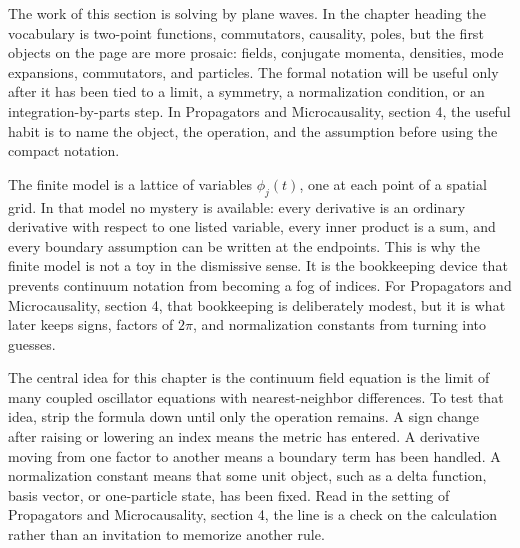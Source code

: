











The work of this section is solving by plane waves.  In the chapter heading the vocabulary is two-point functions, commutators, causality, poles, but the first objects on the page are more prosaic: fields, conjugate momenta, densities, mode expansions, commutators, and particles.  The formal notation will be useful only after it has been tied to a limit, a symmetry, a normalization condition, or an integration-by-parts step.  In Propagators and Microcausality, section 4, the useful habit is to name the object, the operation, and the assumption before using the compact notation.

The finite model is a lattice of variables \(\phi_j(t)\), one at each point of a spatial grid.  In that model no mystery is available: every derivative is an ordinary derivative with respect to one listed variable, every inner product is a sum, and every boundary assumption can be written at the endpoints.  This is why the finite model is not a toy in the dismissive sense.  It is the bookkeeping device that prevents continuum notation from becoming a fog of indices.  For Propagators and Microcausality, section 4, that bookkeeping is deliberately modest, but it is what later keeps signs, factors of \(2\pi\), and normalization constants from turning into guesses.

The central idea for this chapter is the continuum field equation is the limit of many coupled oscillator equations with nearest-neighbor differences.  To test that idea, strip the formula down until only the operation remains.  A sign change after raising or lowering an index means the metric has entered.  A derivative moving from one factor to another means a boundary term has been handled.  A normalization constant means that some unit object, such as a delta function, basis vector, or one-particle state, has been fixed.  Read in the setting of Propagators and Microcausality, section 4, the line is a check on the calculation rather than an invitation to memorize another rule.

